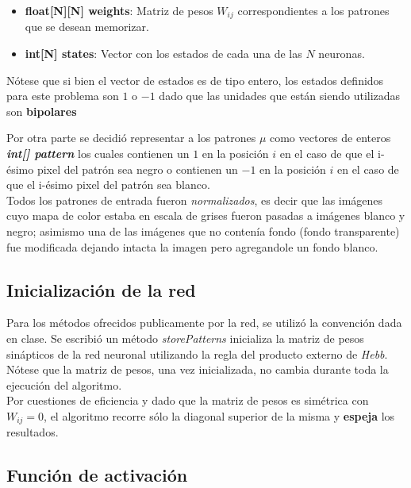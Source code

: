\documentclass[%
    final,
    reprint,
    notitlepage,
    narroweqnarray,
    inline,
    twoside,
    invited
    ]{ieee}
\begin{document}
\begin{itemize}
\item \textbf{float[N][N] weights}: Matriz de pesos $W_{ij}$ correspondientes a los patrones que se desean memorizar.
\item \textbf{int[N] states}: Vector con los estados de cada una de las $N$ neuronas.\\
\end{itemize}

\par Nótese que si bien el vector de estados es de tipo entero, los estados definidos para este problema son $1$ o $-1$ dado que las unidades que están siendo utilizadas son \textbf{bipolares}\\

\par Por otra parte se decidió representar a los patrones $\mu$ como vectores de enteros \textbf{\textit{int[] pattern}} los cuales contienen un $1$ en la posición $i$ en el caso de que el i-ésimo pixel del patrón sea negro o contienen un $-1$ en la posición $i$ en el caso de que el i-ésimo pixel del patrón sea blanco.\\
Todos los patrones de entrada fueron \textit{normalizados}, es decir que las imágenes cuyo mapa de color estaba en escala de grises fueron pasadas a imágenes blanco y negro; asimismo una de las imágenes que no contenía fondo (fondo transparente) fue modificada dejando intacta la imagen pero agregandole un fondo blanco.
	

\subsection{Inicialización de la red}

\par Para los métodos ofrecidos publicamente por la red, se utilizó la convención dada en clase. Se escribió un método \textit{storePatterns} inicializa la matriz de pesos sinápticos de la red neuronal utilizando la regla del producto externo de \textit{Hebb}. Nótese que la matriz de pesos, una vez inicializada, no cambia durante toda la ejecución del algoritmo.\\
Por cuestiones de eficiencia y dado que la matriz de pesos es simétrica con $W_{ij} = 0$, el algoritmo recorre sólo la diagonal superior de la misma y \textbf{espeja} los resultados.

\subsection{Función de activación}
\end{document}
